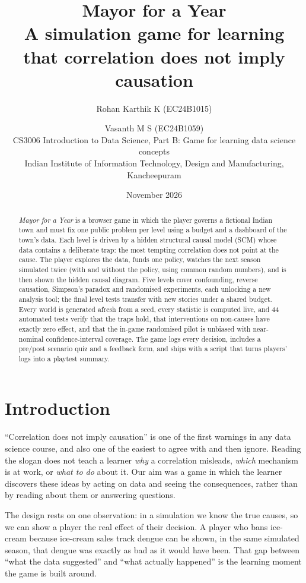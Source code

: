 \documentclass[11pt,a4paper]{article}
\title{\textbf{Mayor for a Year}\\[4pt]\large A simulation game for learning that correlation does not imply causation}
\author{Rohan Karthik K (EC24B1015) \and Vasanth M S (EC24B1059)\\[4pt]
\small CS3006 Introduction to Data Science, Part B: Game for learning data science concepts\\
\small Indian Institute of Information Technology, Design and Manufacturing, Kancheepuram}
\date{November 2026}
\begin{document}
\maketitle

\begin{abstract}
\noindent \emph{Mayor for a Year} is a browser game in which the player governs a fictional Indian town and must
fix one public problem per level using a budget and a dashboard of the town's data. Each level is driven by a hidden
structural causal model (SCM) whose data contains a deliberate trap: the most tempting correlation does not point at
the cause. The player explores the data, funds one policy, watches the next season simulated twice (with and without
the policy, using common random numbers), and is then shown the hidden causal diagram. Five levels cover confounding,
reverse causation, Simpson's paradox and randomised experiments, each unlocking a new analysis tool; the final level
tests transfer with new stories under a shared budget. Every world is generated afresh from a seed, every statistic is
computed live, and 44 automated tests verify that the traps hold, that interventions on non-causes have exactly zero
effect, and that the in-game randomised pilot is unbiased with near-nominal confidence-interval coverage. The game logs
every decision, includes a pre/post scenario quiz and a feedback form, and ships with a script that turns players' logs
into a playtest summary.
\end{abstract}

\section{Introduction}
``Correlation does not imply causation'' is one of the first warnings in any data science course, and also one of the
easiest to agree with and then ignore. Reading the slogan does not teach a learner \emph{why} a correlation misleads,
\emph{which} mechanism is at work, or \emph{what to do} about it. Our aim was a game in which the learner discovers these
ideas by acting on data and seeing the consequences, rather than by reading about them or answering questions.

The design rests on one observation: in a simulation we know the true causes, so we can show a player the real effect of
their decision. A player who bans ice-cream because ice-cream sales track dengue can be shown, in the same simulated
season, that dengue was exactly as bad as it would have been. That gap between ``what the data suggested'' and ``what
actually happened'' is the learning moment the game is built around.
\end{document}
